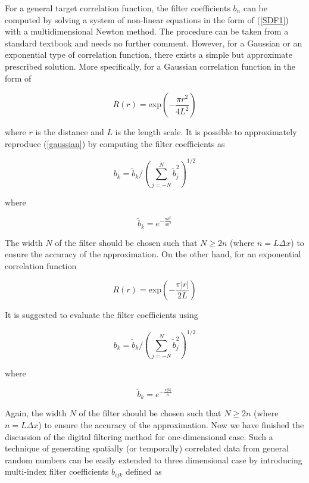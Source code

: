 For a general target correlation function, the filter coefficients $b_n$ can be computed by solving a system of non-linear equations in the form of (\ref{SDF1}) with a multidimensional Newton method. The procedure can be taken from a standard textbook and needs no further comment. However, for a Gaussian or an exponential type of correlation function, there exists a simple but approximate prescribed solution. More specifically, for a Gaussian correlation function in the form of

\begin{equation} \label{gaussian}
R(r) = \mathrm{exp}\left(-\frac{\pi r^2}{4L^2}\right)
\end{equation}

\noindent where $r$ is the distance and $L$ is the length scale. It is possible to approximately reproduce (\ref{gaussian}) by computing the filter coefficients as

\begin{equation}
b_k = \tilde{b}_k / \left( \sum_{j=-N}^N \tilde{b}_j^2 \right)^{1/2}
\end{equation}

\noindent where

\begin{equation}
\tilde{b}_k = e^{-\frac{\pi k^2}{4n^2}}
\end{equation}

\noindent The width $N$ of the filter should be chosen such that $N\geq 2n$ (where $n=L\varDelta x$) to ensure the accuracy of the approximation. On the other hand, for an exponential correlation function

\begin{equation}
R(r) = \mathrm{exp}\left(-\frac{\pi |r|}{2L}\right)
\end{equation}

\noindent It is suggested \citep{xie2008} to evaluate the filter coefficients using

\begin{equation} \label{exponential}
b_k = \tilde{b}_k / \left( \sum_{j=-N}^N \tilde{b}_j^2 \right)^{1/2}
\end{equation}

\noindent where

\begin{equation}
\tilde{b}_k = e^{-\frac{\pi|k|}{n}}
\end{equation}

\noindent Again, the width $N$ of the filter should be chosen such that $N\geq 2n$ (where $n=L\varDelta x$) to ensure the accuracy of the approximation. Now we have finished the discussion of the digital filtering method for one-dimensional case. Such a technique of generating spatially (or temporally) correlated data from general random numbers can be easily extended to three dimensional case by introducing multi-index filter coefficients $b_{ijk}$ defined as

